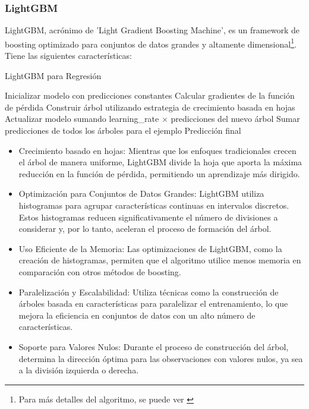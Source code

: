 \documentclass[12pt]{article}
\begin{document}
\subsubsection{LightGBM}

LightGBM, acrónimo de 'Light Gradient Boosting Machine', es un framework de boosting optimizado para conjuntos de datos grandes y altamente dimensional\footnote{Para más detalles del algoritmo, se puede ver \cite{lightgbm}}. Tiene las siguientes características:

\begin{algorithm}
\caption{LightGBM para Regresión}
\begin{algorithmic}[1]
    \State Inicializar modelo con predicciones constantes
        \State Calcular gradientes de la función de pérdida
        \State Construir árbol utilizando estrategia de crecimiento basada en hojas
        \State Actualizar modelo sumando learning\_rate $\times$ predicciones del nuevo árbol
    \EndFor
        \State Sumar predicciones de todos los árboles para el ejemplo
        \State \Return Predicción final
    \EndProcedure
\EndProcedure
\end{algorithmic}
\end{algorithm}


\begin{itemize}
  \item Crecimiento basado en hojas: Mientras que los enfoques tradicionales crecen el árbol de manera uniforme, LightGBM divide la hoja que aporta la máxima reducción en la función de pérdida, permitiendo un aprendizaje más dirigido.
  \item Optimización para Conjuntos de Datos Grandes: LightGBM utiliza histogramas para agrupar características continuas en intervalos discretos. Estos histogramas reducen significativamente el número de divisiones a considerar y, por lo tanto, aceleran el proceso de formación del árbol.
  \item Uso Eficiente de la Memoria: Las optimizaciones de LightGBM, como la creación de histogramas, permiten que el algoritmo utilice menos memoria en comparación con otros métodos de boosting.
  \item Paralelización y Escalabilidad: Utiliza técnicas como la construcción de árboles basada en características para paralelizar el entrenamiento, lo que mejora la eficiencia en conjuntos de datos con un alto número de características.
  \item Soporte para Valores Nulos: Durante el proceso de construcción del árbol, determina la dirección óptima para las observaciones con valores nulos, ya sea a la división izquierda o derecha.
\end{itemize}
\end{document}
